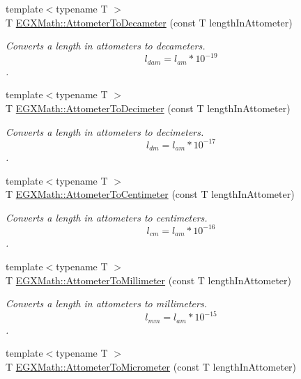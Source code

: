 \begin{DoxyCompactItemize}
{\footnotesize template$<$typename T $>$ }\\T \mbox{\hyperlink{group___e_g_x_math-_conversions-_length_conversions-_s_i-_attometer-_s_i_gadfda74b37224249b3fb2644fb9611d95}{E\+G\+X\+Math\+::\+Attometer\+To\+Decameter}} (const T length\+In\+Attometer)
\begin{DoxyCompactList}\small\item\em Converts a length in attometers to decameters. \[ l_{dam}=l_{am} * 10^{-19} \]. \end{DoxyCompactList}\item 
{\footnotesize template$<$typename T $>$ }\\T \mbox{\hyperlink{group___e_g_x_math-_conversions-_length_conversions-_s_i-_attometer-_s_i_gaa819fb588dcc42855d8e40578b54527e}{E\+G\+X\+Math\+::\+Attometer\+To\+Decimeter}} (const T length\+In\+Attometer)
\begin{DoxyCompactList}\small\item\em Converts a length in attometers to decimeters. \[ l_{dm}=l_{am} * 10^{-17} \]. \end{DoxyCompactList}\item 
{\footnotesize template$<$typename T $>$ }\\T \mbox{\hyperlink{group___e_g_x_math-_conversions-_length_conversions-_s_i-_attometer-_s_i_gaff6439c15e3bb4a90595864e814960a7}{E\+G\+X\+Math\+::\+Attometer\+To\+Centimeter}} (const T length\+In\+Attometer)
\begin{DoxyCompactList}\small\item\em Converts a length in attometers to centimeters. \[ l_{cm}=l_{am} * 10^{-16} \]. \end{DoxyCompactList}\item 
{\footnotesize template$<$typename T $>$ }\\T \mbox{\hyperlink{group___e_g_x_math-_conversions-_length_conversions-_s_i-_attometer-_s_i_gaa1844671e09a5d485145eb7cc152ba19}{E\+G\+X\+Math\+::\+Attometer\+To\+Millimeter}} (const T length\+In\+Attometer)
\begin{DoxyCompactList}\small\item\em Converts a length in attometers to millimeters. \[ l_{mm}=l_{am} * 10^{-15} \]. \end{DoxyCompactList}\item 
{\footnotesize template$<$typename T $>$ }\\T \mbox{\hyperlink{group___e_g_x_math-_conversions-_length_conversions-_s_i-_attometer-_s_i_gaa98a14657ea865a6cac8fb8fc42172a2}{E\+G\+X\+Math\+::\+Attometer\+To\+Micrometer}} (const T length\+In\+Attometer)

\end{DoxyCompactItemize}
